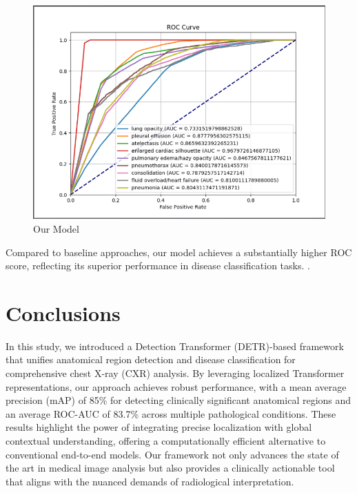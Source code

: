 \documentclass[10pt,twocolumn,letterpaper]{article}
\begin{document}
\begin{figure}[H]
    \centering
    \includegraphics[width=1\linewidth]{assets/detr_roc.png}
    \caption{Our Model}
    \label{fig:enter-label}
\end{figure}

Compared to baseline approaches, our model achieves a substantially higher ROC score, reflecting its superior performance in disease classification tasks. .

\section{Conclusions}
In this study, we introduced a Detection Transformer (DETR)-based framework that unifies anatomical region detection and disease classification for comprehensive chest X-ray (CXR) analysis. By leveraging localized Transformer representations, our approach achieves robust performance, with a mean average precision (mAP) of 85\% for detecting clinically significant anatomical regions and an average ROC-AUC of 83.7\% across multiple pathological conditions. These results highlight the power of integrating precise localization with global contextual understanding, offering a computationally efficient alternative to conventional end-to-end models. Our framework not only advances the state of the art in medical image analysis but also provides a clinically actionable tool that aligns with the nuanced demands of radiological interpretation.
\end{document}
